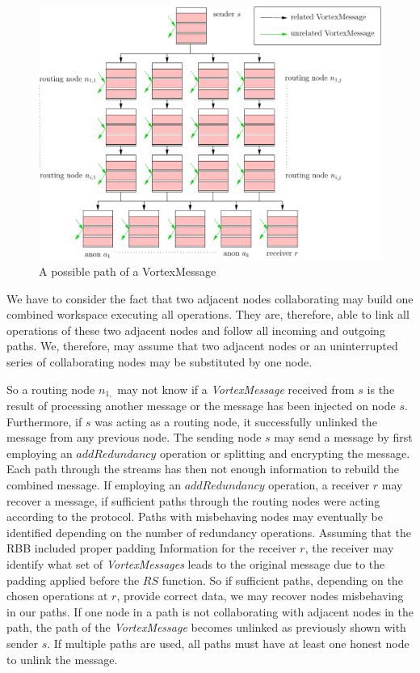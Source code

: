\documentclass[acmsmall, screen]{acmart}
\begin{document}
\begin{figure}[ht]
	\centering\includegraphics[width=0.5\columnwidth]{messagePaths}
	\caption{A possible path of a VortexMessage}
	\label{fig:messagePaths}
\end{figure}

We have to consider the fact that two adjacent nodes collaborating may build one combined workspace executing all operations. They are, therefore, able to link all operations of these two adjacent nodes and follow all incoming and outgoing paths. We, therefore, may assume that two adjacent nodes or an uninterrupted series of collaborating nodes may be substituted by one node.

So a routing node $n_{1,}$ may not know if a \emph{VortexMessage} received from $s$ is the result of processing another message or the message has been injected on node $s$. Furthermore, if $s$ was acting as a routing node, it successfully unlinked the message from any previous node. The sending node $s$ may send a message by first employing an $addRedundancy$ operation or splitting and encrypting the message. Each path through the streams has then not enough information to rebuild the combined message. If employing an $addRedundancy$ operation, a receiver $r$ may recover a message, if sufficient paths through the routing nodes were acting according to the protocol. Paths with misbehaving nodes may eventually be identified depending on the number of redundancy operations. Assuming that the RBB included proper padding Information for the receiver $r$, the receiver may identify what set of \emph{VortexMessages} leads to the original message due to the padding applied before the $RS$ function. So if sufficient paths, depending on the chosen operations at $r$, provide correct data, we may recover nodes misbehaving in our paths. If one node in a path is not collaborating with adjacent nodes in the path, the path of the \emph{VortexMessage} becomes unlinked as previously shown with sender $s$. If multiple paths are used, all paths must have at least one honest node to unlink the message. 
\end{document}
